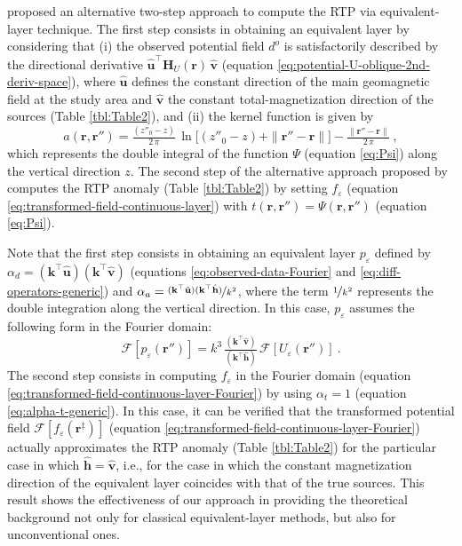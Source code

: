 \documentclass[manuscript,noblind]{geophysics}
\begin{document}
	\citet{guspi_novara2009} proposed an alternative two-step approach to compute the RTP via equivalent-layer technique. 
	The first step consists in obtaining an equivalent layer by considering that (i) the observed potential field $d^{o}$
	is satisfactorily described by the directional derivative 
	$\hat{\mathbf{u}}^{\top} \mathbf{H}_{U}(\mathbf{r}) \, \hat{\mathbf{v}}$ 
	(equation \ref{eq:potential-U-oblique-2nd-deriv-space}), where $\hat{\mathbf{u}}$ defines the constant direction of the main geomagnetic
	field at the study area and $\hat{\mathbf{v}}$ the constant total-magnetization direction of the sources  (Table \ref{tbl:Table2}), and (ii)
	the kernel function is given by 
	\begin{equation}
		a(\mathbf{r}, \mathbf{r}'') = \tfrac{\left( z''_{0} - z \right)}{2 \, \pi} \, 
		\ln{\Big[} \left( z''_{0} - z \right) + \| \mathbf{r}'' - \mathbf{r} \| {\Big]} - 
		\tfrac{\| \mathbf{r}'' - \mathbf{r} \|}{2 \, \pi} \: ,
		\label{eq:kernel-Fourier-Guspi}
	\end{equation}
	which represents the double integral of the function $\Psi$ (equation \ref{eq:Psi}) 
	along the vertical direction $z$.
	The second step of the alternative approach proposed by \citet{guspi_novara2009} computes the RTP anomaly 
	(Table \ref{tbl:Table2}) by setting $f_{\varepsilon}$ (equation \ref{eq:transformed-field-continuous-layer}) with 
	$t(\mathbf{r}, \mathbf{r}'') = \Psi(\mathbf{r}, \mathbf{r}'')$ (equation \ref{eq:Psi}).
	
	Note that the first step consists in obtaining an equivalent layer $p_{\varepsilon}$ defined by 
	$\alpha_{d} = (\mathbf{k}^{\top} \hat{\mathbf{u}}) (\mathbf{k}^{\top} \hat{\mathbf{v}})$ (equations \ref{eq:observed-data-Fourier} 
	and \ref{eq:diff-operators-generic}) and 
	$\alpha_{a} = \nicefrac{(\mathbf{k}^{\top} \hat{\mathbf{u}}) (\mathbf{k}^{\top} \hat{\mathbf{h}})}{k^{2}}$, 
	where the term $\nicefrac{1}{k^{2}}$ represents the double integration along the vertical direction. In this case,  
	$p_{\varepsilon}$ assumes the following form in the Fourier domain:
	\begin{equation}
		\mathcal{F} [ p_{\varepsilon}(\mathbf{r}'') ] =
		k^{3} \, \tfrac{\left(\mathbf{k}^{\top} \hat{\mathbf{v}} \right)}{\left(\mathbf{k}^{\top} \hat{\mathbf{h}} \right)} \,
		\mathcal{F} \left[ U_{\varepsilon}(\mathbf{r}'') \right] \: .
		\label{eq:p-Fourier-guspi}
	\end{equation}
	The second step consists in computing $f_{\varepsilon}$ in the Fourier domain (equation \ref{eq:transformed-field-continuous-layer-Fourier}) 
	by using $\alpha_{t} = 1$ (equation \ref{eq:alpha-t-generic}).
	In this case, it can be verified that the transformed potential field $\mathcal{F} [ f_{\varepsilon}(\mathbf{r}^{\ddagger}) ]$ 
	(equation \ref{eq:transformed-field-continuous-layer-Fourier}) actually approximates the RTP anomaly  (Table \ref{tbl:Table2}) 
	for the particular case in which $\hat{\mathbf{h}} = \hat{\mathbf{v}}$, 
	i.e., for the case in which the constant magnetization direction of the equivalent layer coincides with that of the true sources.
	This result shows the effectiveness of our approach in providing the theoretical background not only for classical 
	equivalent-layer methods, but also for unconventional ones.
	
\end{document}
